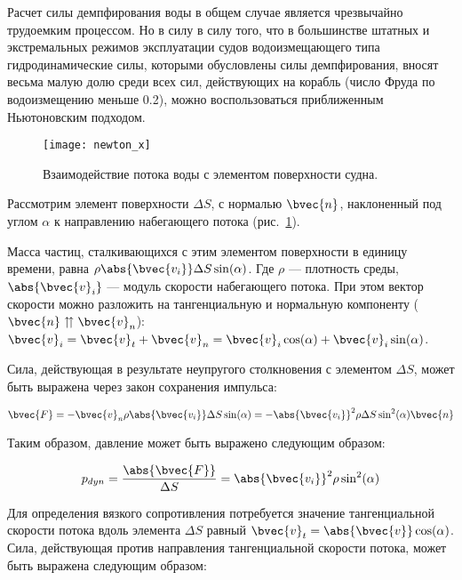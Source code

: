 
Расчет силы демпфирования воды в общем случае является чрезвычайно трудоемким процессом. Но в силу в силу того, что в большинстве штатных и экстремальных режимов эксплуатации судов водоизмещающего типа гидродинамические силы, которыми обусловлены силы демпфирования, вносят весьма малую долю среди всех сил, действующих на корабль (число Фруда по водоизмещению меньше 0.2), можно воспользоваться приближенным Ньютоновским подходом.

\begin{figure}[ht]
\begin{center}
\texttt{[image: newton\_x]}
\end{center}
\caption{Взаимодействие потока воды с элементом поверхности судна.}
\label{newton_x}
\end{figure}

Рассмотрим элемент поверхности $\Delta S$, с нормалью $\bvec{n}$, наклоненный под углом $\alpha$ к направлению набегающего потока (рис.~\ref{newton_x}).

Масса частиц, сталкивающихся с этим элементом поверхности в единицу времени, равна 
$\rho \abs{\bvec{v_i}} \Delta S \sin(\alpha)$. Где $\rho$ --- плотность среды, $\abs{\bvec{v}_i}$ --- модуль скорости набегающего потока. При этом вектор скорости можно разложить на тангенциальную и нормальную компоненту ($\bvec{n} \upuparrows \bvec{v}_n$): $\bvec{v}_{i}=\bvec{v}_t + \bvec{v}_n = \bvec{v}_{i} \cos(\alpha) + \bvec{v}_{i} \sin(\alpha)$.

Сила, действующая в результате неупругого столкновения с элементом $\Delta S$,
может быть выражена через закон сохранения импульса:

\begin{equation}
	\bvec{F} = -\bvec{v}_n \rho \abs{\bvec{v_i}} \Delta S \sin(\alpha)
			 = -\abs{\bvec{v_i}}^2 \rho \Delta S \sin^2(\alpha) \bvec{n}
\end{equation}

Таким образом, давление может быть выражено следующим образом:

\begin{equation}
	p_{dyn} = \frac{\abs{\bvec{F}}}{\Delta S} = \abs{\bvec{v_i}}^2 \rho \sin^2(\alpha)
\end{equation}

Для определения вязкого сопротивления потребуется значение тангенциальной скорости потока вдоль элемента 
$\Delta S$ равный $\bvec{v}_t = \abs{\bvec{v}} \cos(\alpha)$. Сила, действующая против направления тангенциальной скорости потока, может быть выражена следующим образом:

